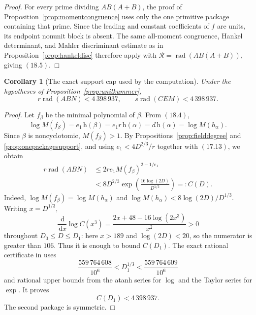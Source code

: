 \documentclass[11pt]{article}
\newtheorem{corollary}[theorem]{Corollary}
\theoremstyle{definition}
\newcommand{\dd}{\,\mathrm d}
\begin{document}
\begin{proof}
For every prime dividing \(AB(A+B)\), the proof of
Proposition~\ref{prop:momentcongruence} uses only the one primitive package
containing that prime.  Since the leading and constant coefficients of \(f\)
are units, its endpoint nonunit block is absent.  The same all-moment
congruence, Hankel determinant, and Mahler discriminant estimate as in
Proposition~\ref{prop:hankeldisc} therefore apply with
\(\mathcal R=\operatorname{rad}(AB(A+B))\), giving \((18.5)\).
\end{proof}

\begin{corollary}[The exact support cap used by the computation]
\label{cor:unitsupportcap}
Under the hypotheses of Proposition~\ref{prop:unitkummer},
\begin{equation}
 r\operatorname{rad}(ABN)<4\,398\,937,
 \qquad
 s\operatorname{rad}(CEM)<4\,398\,937.
 \tag{18.6}
\end{equation}
\end{corollary}

\begin{proof}
Let \(f_\beta\) be the minimal polynomial of \(\beta\).  From \((18.4)\),
\[
 \log M(f_\beta)
 =e_1\,\mathrm h(\beta)
 =e_1r\,\mathrm h(\alpha)
 =d\,\mathrm h(\alpha)
 =\log M(h_\alpha).
\]
Since \(\beta\) is noncyclotomic, \(M(f_\beta)>1\).  By
Propositions~\ref{prop:fielddegree} and \ref{prop:onepackagesupport}, and
using \(e_1<4D^{2/3}/r\) together with \((17.13)\), we obtain
\[
 \begin{aligned}
 r\operatorname{rad}(ABN)
 &\leq2re_1M(f_\beta)^{2-1/e_1}\\
 &<8D^{2/3}
   \exp\!\left(\frac{16\log(2D)}{D^{1/3}}\right)
 =:C(D).
 \end{aligned}
\]
Indeed, \(\log M(f_\beta)=\log M(h_\alpha)\) and
\(\log M(h_\alpha)<8\log(2D)/D^{1/3}\).  Writing
\(x=D^{1/3}\),
\[
 \frac{\dd}{\dd x}\log C(x^3)
 =\frac{2x+48-16\log(2x^3)}{x^2}>0
\]
throughout \(D_0\leq D\leq D_1\): here \(x>189\) and
\(\log(2D)<20\), so the numerator is greater than \(106\).  Thus it is
enough to bound \(C(D_1)\).  The exact rational certificate in
 uses
\[
 \frac{559\,764\,608}{10^6}<D_1^{1/3}
 <\frac{559\,764\,609}{10^6}
\]
and rational upper bounds from the atanh series for \(\log\) and the Taylor
series for \(\exp\).  It proves
\[
 C(D_1)<4\,398\,937.
\]
The second package is symmetric.
\end{proof}
\end{document}
